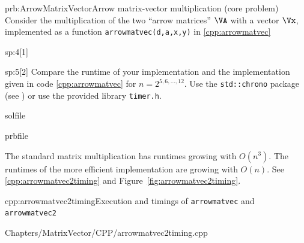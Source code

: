 \begin{samproblem}{prb:ArrowMatrixVector}{Arrow matrix-vector multiplication (core problem)}{
Consider the multiplication of the two ``arrow matrices'' $\VA$ with a vector $\Vx$,
implemented as a function \texttt{arrowmatvec(d,a,x,y)} in \cref{cpp:arrowmatvec}
}
\begin{subproblem}{sp:4}[1]
\end{subproblem}


\begin{subproblem}{sp:5}[2]
  Compare the runtime of your implementation and the implementation given in code \ref{cpp:arrowmatvec} for $n=2^{5,6,\ldots,12}$.
  Use the \texttt{std::chrono} package (see \hyperlink{link}{}) or use the provided library \texttt{timer.h}.

  \begin{samwriteprbpart}{solfile}
    \begin{writeverbatim}{prbfile}
      \begin{samsolution}
      The standard matrix multiplication has runtimes growing with $O(n^3)$.
      The runtimes of the more efficient implementation are growing with $O(n)$.
      See \autoref{cpp:arrowmatvec2timing} and Figure~\ref{fig:arrowmatvec2timing}.

      \begin{samcode}[C++-code]{cpp:arrowmatvec2timing}{Execution and timings of \texttt{arrowmatvec} and \texttt{arrowmatvec2}}
        
        {Chapters/MatrixVector/CPP/arrowmatvec2timing.cpp}
      \end{samcode}


\end{samsolution}
\end{writeverbatim}
\end{samwriteprbpart}
\end{subproblem}
\end{samproblem}
